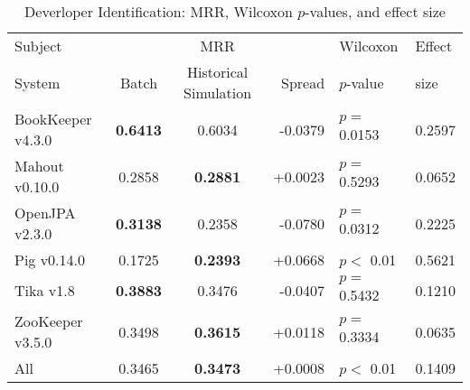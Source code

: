 \begin{table}[t]
\centering
\caption{Deverloper Identification: MRR, Wilcoxon $p$-values, and effect size}
\begin{tabular}{l|ccr|ll}
\toprule
Subject & & MRR & & Wilcoxon & Effect \\
System  &  Batch & Historical Simulation & Spread & $p$-value & size \\
\midrule
BookKeeper v4.3.0 & {\bf 0.6413 } & 0.6034 & -0.0379 & $p = $ 0.0153 & 0.2597 \\
Mahout v0.10.0 & 0.2858 & {\bf 0.2881 } & +0.0023 & $p = $ 0.5293 & 0.0652 \\
OpenJPA v2.3.0 & {\bf 0.3138 } & 0.2358 & -0.0780 & $p = $ 0.0312 & 0.2225 \\
Pig v0.14.0 & 0.1725 & {\bf 0.2393 } & +0.0668 & $p < $ 0.01 & 0.5621 \\
Tika v1.8 & {\bf 0.3883 } & 0.3476 & -0.0407 & $p = $ 0.5432 & 0.1210 \\
ZooKeeper v3.5.0 & 0.3498 & {\bf 0.3615 } & +0.0118 & $p = $ 0.3334 & 0.0635 \\
\midrule
All & 0.3465 & {\bf 0.3473 } & +0.0008 & $p < $ 0.01 & 0.1409 \\
\bottomrule
\end{tabular}
\label{table:triage_rq2}
\end{table}
